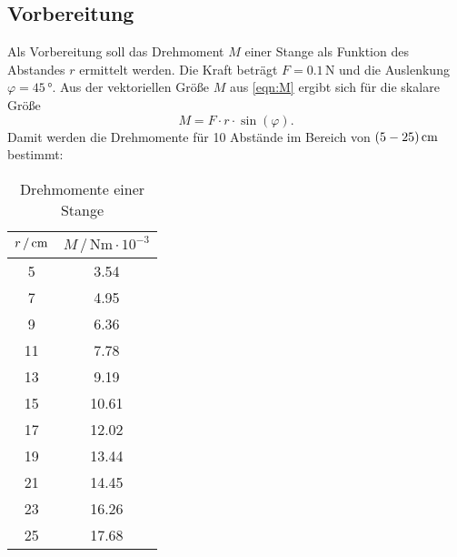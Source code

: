 \subsection{Vorbereitung}
Als Vorbereitung soll das Drehmoment $M$ einer Stange als Funktion des Abstandes $r$
ermittelt werden. Die Kraft beträgt $F = 0.1 \,\si{\newton}$ und die Auslenkung
$\varphi = 45 \,\si{\degree}$.
Aus der vektoriellen Größe $M$ aus \eqref{eqn:M} ergibt sich für die skalare Größe
\begin{equation}
  M = F \cdot r \cdot \sin{(\varphi)}.
\end{equation}
Damit werden die Drehmomente für 10 Abstände im Bereich von $(5-25)\,\si{\centi\meter}$ bestimmt:
\begin{table}
  \centering
  \begin{tabular}{c c}
    \toprule
    $r\,/\,\si{\centi\meter}$ & $M\,/\,\si{\newton\meter}\cdot 10^{-3}$ \\
    \midrule
    5     &  3.54   \\
    7     &  4.95   \\
    9     &  6.36   \\
    11    &  7.78   \\
    13    &  9.19   \\
    15    & 10.61   \\
    17    & 12.02    \\
    19    & 13.44    \\
    21    & 14.45    \\
    23    & 16.26    \\
    25    & 17.68    \\
    \bottomrule
    \end{tabular}
    \caption{Drehmomente einer Stange}
\end{table}
